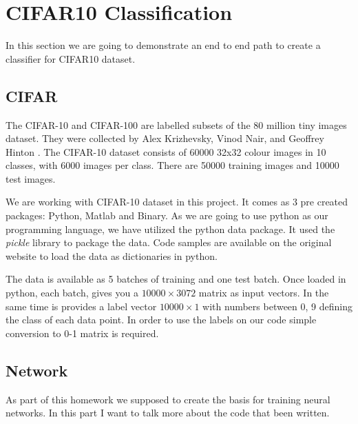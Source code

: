 \section{CIFAR10 Classification}
In this section we are going to demonstrate an end to end path to create a classifier for CIFAR10 dataset. 
\subsection{CIFAR}
The CIFAR-10 and CIFAR-100 are labelled subsets of the 80 million tiny images dataset. They were collected by Alex Krizhevsky, Vinod Nair, and Geoffrey Hinton \cite{cifar_report}. The CIFAR-10 dataset consists of 60000 32x32 colour images in 10 classes, with 6000 images per class. There are 50000 training images and 10000 test images.

We are working with CIFAR-10 dataset in this project. It comes as 3 pre created packages: Python, Matlab and Binary. As we are going to use python as  our programming language, we have utilized the python data package. It used the \textit{pickle} library to package the data.  Code samples are available on the original website to load the data as dictionaries in python. 

The data is available as 5 batches of training and one test batch.  Once loaded in python, each batch, gives you a $10000 \times 3072 $ matrix as input vectors. In the same time  is provides a label vector $10000 \times 1$ with numbers between 0, 9 defining the class of each data point.  In order to use the labels on our code simple conversion to 0-1 matrix is required. 

\subsection{Network}
As part of this homework we supposed to create the basis for training neural networks. In this part I want to talk more about the code that been written. 

